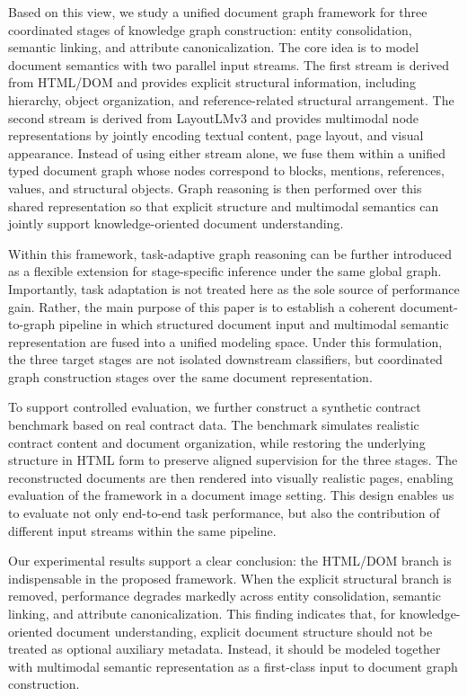 \documentclass[pdflatex,twocolumn,iicol,sn-vancouver-num]{sn-jnl}%
\theoremstyle{thmstyleone}%
\theoremstyle{thmstyletwo}%
\theoremstyle{thmstylethree}%
\begin{document}
Based on this view, we study a unified document graph framework for three coordinated stages of knowledge graph construction: entity consolidation, semantic linking, and attribute canonicalization. The core idea is to model document semantics with two parallel input streams. The first stream is derived from HTML/DOM and provides explicit structural information, including hierarchy, object organization, and reference-related structural arrangement. The second stream is derived from LayoutLMv3 and provides multimodal node representations by jointly encoding textual content, page layout, and visual appearance. Instead of using either stream alone, we fuse them within a unified typed document graph whose nodes correspond to blocks, mentions, references, values, and structural objects. Graph reasoning is then performed over this shared representation so that explicit structure and multimodal semantics can jointly support knowledge-oriented document understanding.

Within this framework, task-adaptive graph reasoning can be further introduced as a flexible extension for stage-specific inference under the same global graph. Importantly, task adaptation is not treated here as the sole source of performance gain. Rather, the main purpose of this paper is to establish a coherent document-to-graph pipeline in which structured document input and multimodal semantic representation are fused into a unified modeling space. Under this formulation, the three target stages are not isolated downstream classifiers, but coordinated graph construction stages over the same document representation.

To support controlled evaluation, we further construct a synthetic contract benchmark based on real contract data. The benchmark simulates realistic contract content and document organization, while restoring the underlying structure in HTML form to preserve aligned supervision for the three stages. The reconstructed documents are then rendered into visually realistic pages, enabling evaluation of the framework in a document image setting. This design enables us to evaluate not only end-to-end task performance, but also the contribution of different input streams within the same pipeline.

Our experimental results support a clear conclusion: the HTML/DOM branch is indispensable in the proposed framework. When the explicit structural branch is removed, performance degrades markedly across entity consolidation, semantic linking, and attribute canonicalization. This finding indicates that, for knowledge-oriented document understanding, explicit document structure should not be treated as optional auxiliary metadata. Instead, it should be modeled together with multimodal semantic representation as a first-class input to document graph construction.
\end{document}
